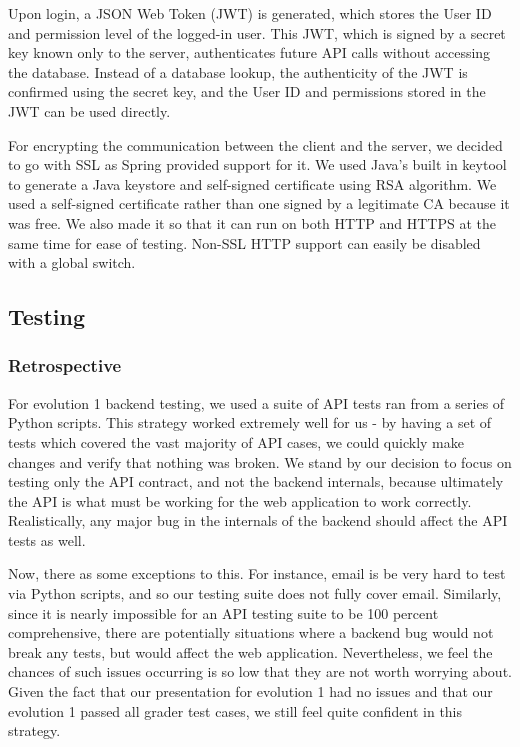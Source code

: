 \documentclass[12pt]{article}
\begin{document}
Upon login, a JSON Web Token (JWT) is generated, which stores the User ID and permission level of the logged-in user. This JWT, which is signed by a secret key known only to the server, authenticates future API calls without accessing the database. Instead of a database lookup, the authenticity of the JWT is confirmed using the secret key, and the User ID and permissions stored in the JWT can be used directly. 

For encrypting the communication between the client and the server, we decided to go with SSL as Spring provided support for it. We used Java's built in keytool to generate a Java keystore and self-signed certificate using RSA algorithm. We used a self-signed certificate rather than one signed by a legitimate CA because it was free. We also made it so that it can run on both HTTP and HTTPS at the same time for ease of testing. Non-SSL HTTP support can easily be disabled with a global switch.


\subsection{Testing}
\subsubsection{Retrospective}
For evolution 1 backend testing, we used a suite of API tests ran from a series of Python scripts. This strategy worked extremely well for us - by having a set of tests which covered the vast majority of API cases, we could quickly make changes and verify that nothing was broken. We stand by our decision to focus on testing only the API contract, and not the backend internals, because ultimately the API is what must be working for the web application to work correctly. Realistically, any major bug in the internals of the backend should affect the API tests as well.


Now, there as some exceptions to this. For instance, email is be very hard to test via Python scripts, and so our testing suite does not fully cover email. Similarly, since it is nearly impossible for an API testing suite to be 100 percent comprehensive, there are potentially situations where a backend bug would not break any tests, but would affect the web application. Nevertheless, we feel the chances of such issues occurring is so low that they are not worth worrying about. Given the fact that our presentation for evolution 1 had no issues and that our evolution 1 passed all grader test cases, we still feel quite confident in this strategy. 
\end{document}
